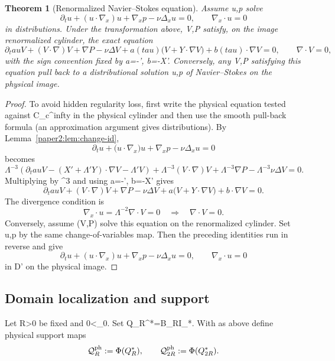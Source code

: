 \documentclass[11pt]{amsart}
\def\({}%
\def\){}%
\def\tau{tau}%
\def\infty{infty}%
\theoremstyle{plain}
\newtheorem{theorem}{Theorem}[section]
\theoremstyle{definition}
\theoremstyle{remark}
\newcommand{\nn}{\nabla}
\begin{document}
\begin{theorem}[Renormalized Navier--Stokes equation]\label{paper2:thm:ren-NS}
Assume \(u,p\) solve
\[
\partial_t u+(u\cdot\nn_x)u+\nn_x p-\nu\Delta_xu=0,\qquad \nn_x\cdot u=0
\]
in distributions. Under the transformation above, \(V,P\) satisfy, on the image
renormalized cylinder, the exact equation
\[
\partial_\tau V+(V\cdot\nn)V+\nn P-\nu\Delta V
+a(\tau)\bigl(V+Y\cdot\nn V\bigr)+b(\tau)\cdot\nn V=0,\qquad \nn\cdot V=0,
\]
with the sign convention fixed by \(a=-\Lambda'\), \(b=-X'\).
Conversely, any \(V,P\) satisfying this equation pull back to a distributional
solution \(u,p\) of Navier--Stokes on the physical image.
\end{theorem}
\begin{proof}
To avoid hidden regularity loss, first write the physical equation tested against
\(\Phi\in C_c^\infty\) in the physical cylinder and then use the smooth pull-back formula
(an approximation argument gives distributions). By Lemma~\ref{paper2:lem:change-id},
\[
\partial_tu+\bigl(u\cdot\nabla_x\bigr)u+\nabla_xp-\nu\Delta_xu=0
\]
becomes
\[
\Lambda^{-3}\!\left(\partial_\tau V-(X'+\Lambda'Y)\cdot\nabla V-\Lambda'V\right)
+\Lambda^{-3}(V\cdot\nabla)V
+\Lambda^{-3}\nabla P
-\Lambda^{-3}\nu\Delta V=0.
\]
Multiplying by \(\Lambda^3\) and using \(a=-\Lambda'\), \(b=-X'\) gives
\[
\partial_\tau V+(V\cdot\nabla)V+\nabla P-\nu\Delta V
+a\bigl(V+Y\cdot\nabla V\bigr)+b\cdot\nabla V=0.
\]
The divergence condition is
\[
\nabla_x\cdot u=\Lambda^{-2}\nabla\cdot V=0
\quad\Longrightarrow\quad
\nabla\cdot V=0.
\]
Conversely, assume \((V,P)\) solve this equation on the renormalized cylinder.
Set \(u,p\) by the same change-of-variables map.
Then the preceding identities run in reverse and give
 \[
\partial_t u+(u\cdot\nabla_x)u+\nabla_xp-\nu\Delta_xu=0,\qquad
\nabla_x\cdot u=0
\]
in \(\mathcal D'\) on the physical image.
\end{proof}

\subsection{Domain localization and support}\label{paper2:sec:domains}

Let \(R>0\) be fixed and \(0<\ell\le \ell_0\). Set \(Q_R^*=B_R\times I_*\).
With \(\Phi\) as above define physical support maps
\[
\mathcal Q^{\rm ph}_{R}:=\Phi(Q_R^*),\qquad
\mathcal Q^{\rm ph}_{2R}:=\Phi(Q_{2R}^*).
\]
\end{document}
